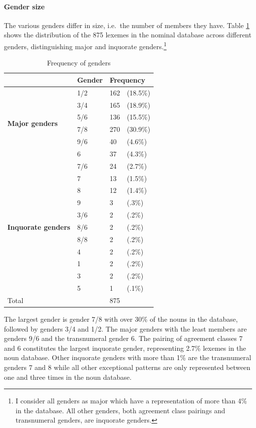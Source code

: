 \paragraph{Gender size} The various genders differ in size, i.e.\ the number of members they have. 
Table \ref{Tab:genderno} shows the distribution of the 875 lexemes in the nominal database across different genders, distinguishing major and inquorate genders.\footnote{I consider all genders as major which have a representation of more than 4\% in the database. All other genders, both agreement class pairings and transnumeral genders, are inquorate genders.}


\begin{table} 
\centering
\begin{tabular}{p{4cm}l|ll}
 \midrule
 & Gender &  \multicolumn{2}{l}{Frequency}  \\ 
 \midrule
 \multirow{6}{*}{{\bfseries Major genders}} & 1/2 & 162 & (18.5\%)  \\ 
 & 3/4  & 165 & (18.9\%) \\
 & 5/6  & 136 & (15.5\%)   \\ 
& 7/8   & 270 & (30.9\%) \\
& 9/6   & 40  & (4.6\%) \\ 
 & 6 &  37 &  (4.3\%) \\ 
 \midrule %
 \multirow{11}{*}{{\bfseries Inquorate genders}} &  7/6  & 24  & (2.7\%) \\
 & 7   & 13  & (1.5\%) \\
 & 8   & 12  & (1.4\%) \\
 & 9   & 3  & (.3\%) \\
 & 3/6  & 2  & (.2\%) \\
 & 8/6   &  2 & (.2\%) \\
& 8/8   & 2 & (.2\%) \\
&  4   & 2  & (.2\%) \\
 & 1   & 2  & (.2\%) \\
 & 3   & 2  & (.2\%) \\
 & 5   & 1  & (.1\%) \\
 \midrule
Total & &  875 & \\
 \midrule
\end{tabular}
\caption{Frequency of genders}
\label{Tab:genderno}
\end{table}

The largest gender is gender 7/8 with over 30\% of the nouns in the database, followed by genders 3/4 and 1/2. The major genders with the least members are genders 9/6 and the transnumeral gender 6. The pairing of agreement classes 7 and 6  constitutes the largest inquorate gender, representing 2.7\% lexemes in the noun database. Other inquorate genders with more than 1\% are the transnumeral genders 7 and 8 while all other exceptional patterns are only represented between one and three times in the noun database.

